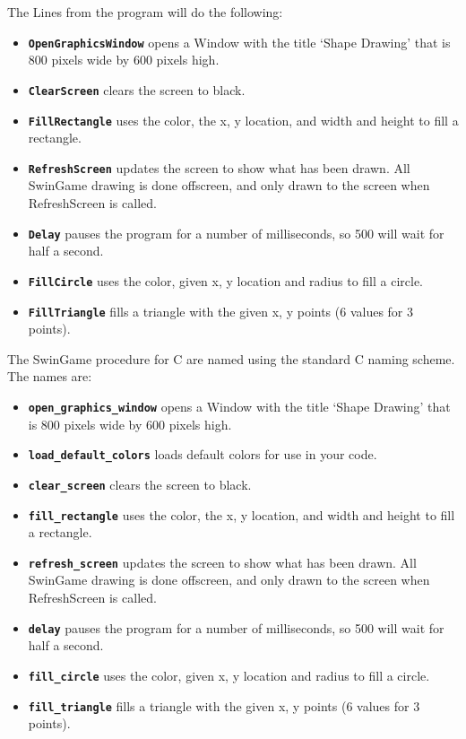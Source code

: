 
The Lines from the program will do the following:
\begin{itemize}
  \item \textbf{\texttt{OpenGraphicsWindow}} opens a Window with the title `Shape Drawing' that is 800 pixels wide by 600 pixels high.
  \item \textbf{\texttt{ClearScreen}} clears the screen to black.
  \item \textbf{\texttt{FillRectangle}} uses the color, the x, y location, and width and height to fill a rectangle.
  \item \textbf{\texttt{RefreshScreen}} updates the screen to show what has been drawn. All SwinGame drawing is done offscreen, and only drawn to the screen when RefreshScreen is called.
  \item \textbf{\texttt{Delay}} pauses the program for a number of milliseconds, so 500 will wait for half a second.
  \item \textbf{\texttt{FillCircle}} uses the color, given x, y location and radius to fill a circle.
  \item \textbf{\texttt{FillTriangle}} fills a triangle with the given x, y points (6 values for 3 points).
\end{itemize}

\clearpage


The SwinGame procedure for C are named using the standard C naming scheme. The names are:
\begin{itemize}
  \item \textbf{\texttt{open\_graphics\_window}} opens a Window with the title `Shape Drawing' that is 800 pixels wide by 600 pixels high.
  \item \textbf{\texttt{load\_default\_colors}} loads default colors for use in your code.
  \item \textbf{\texttt{clear\_screen}} clears the screen to black.
  \item \textbf{\texttt{fill\_rectangle}} uses the color, the x, y location, and width and height to fill a rectangle.
  \item \textbf{\texttt{refresh\_screen}} updates the screen to show what has been drawn. All SwinGame drawing is done offscreen, and only drawn to the screen when RefreshScreen is called.
  \item \textbf{\texttt{delay}} pauses the program for a number of milliseconds, so 500 will wait for half a second.
  \item \textbf{\texttt{fill\_circle}} uses the color, given x, y location and radius to fill a circle.
  \item \textbf{\texttt{fill\_triangle}} fills a triangle with the given x, y points (6 values for 3 points).
\end{itemize}


\clearpage




